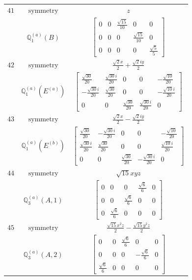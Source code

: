 \documentclass[fleqn,8pt,landscape]{jsarticle}
\begin{document}
\begin{longtable}{ccc}
$ 41 $ & $ \text{symmetry} $ & $ z $ \\
$  $ & $ \mathbb{Q}_{1}^{(a)}(B) $ & $ \begin{bmatrix} 0 & 0 & \frac{\sqrt{15}}{10} & 0 & 0 \\ 0 & 0 & 0 & \frac{\sqrt{15}}{10} & 0 \\ 0 & 0 & 0 & 0 & \frac{\sqrt{5}}{5} \end{bmatrix} $ \\ \hline
$ 42 $ & $ \text{symmetry} $ & $ \frac{\sqrt{2} x}{2} + \frac{\sqrt{2} i y}{2} $ \\
$  $ & $ \mathbb{Q}_{1}^{(a)}(E^{(a)}) $ & $ \begin{bmatrix} \frac{\sqrt{30}}{20} & \frac{\sqrt{30} i}{20} & 0 & 0 & - \frac{\sqrt{10}}{20} \\ - \frac{\sqrt{30} i}{20} & \frac{\sqrt{30}}{20} & 0 & 0 & - \frac{\sqrt{10} i}{20} \\ 0 & 0 & \frac{\sqrt{30}}{20} & \frac{\sqrt{30} i}{20} & 0 \end{bmatrix} $ \\ \hline
$ 43 $ & $ \text{symmetry} $ & $ \frac{\sqrt{2} x}{2} - \frac{\sqrt{2} i y}{2} $ \\
$  $ & $ \mathbb{Q}_{1}^{(a)}(E^{(b)}) $ & $ \begin{bmatrix} \frac{\sqrt{30}}{20} & - \frac{\sqrt{30} i}{20} & 0 & 0 & - \frac{\sqrt{10}}{20} \\ \frac{\sqrt{30} i}{20} & \frac{\sqrt{30}}{20} & 0 & 0 & \frac{\sqrt{10} i}{20} \\ 0 & 0 & \frac{\sqrt{30}}{20} & - \frac{\sqrt{30} i}{20} & 0 \end{bmatrix} $ \\ \hline
$ 44 $ & $ \text{symmetry} $ & $ \sqrt{15} x y z $ \\
$  $ & $ \mathbb{Q}_{3}^{(a)}(A,1) $ & $ \begin{bmatrix} 0 & 0 & 0 & \frac{\sqrt{6}}{6} & 0 \\ 0 & 0 & \frac{\sqrt{6}}{6} & 0 & 0 \\ 0 & \frac{\sqrt{6}}{6} & 0 & 0 & 0 \end{bmatrix} $ \\ \hline
$ 45 $ & $ \text{symmetry} $ & $ \frac{\sqrt{15} x^{2} z}{2} - \frac{\sqrt{15} y^{2} z}{2} $ \\
$  $ & $ \mathbb{Q}_{3}^{(a)}(A,2) $ & $ \begin{bmatrix} 0 & 0 & \frac{\sqrt{6}}{6} & 0 & 0 \\ 0 & 0 & 0 & - \frac{\sqrt{6}}{6} & 0 \\ \frac{\sqrt{6}}{6} & 0 & 0 & 0 & 0 \end{bmatrix} $ \\ \hline

\end{longtable}
\end{document}
